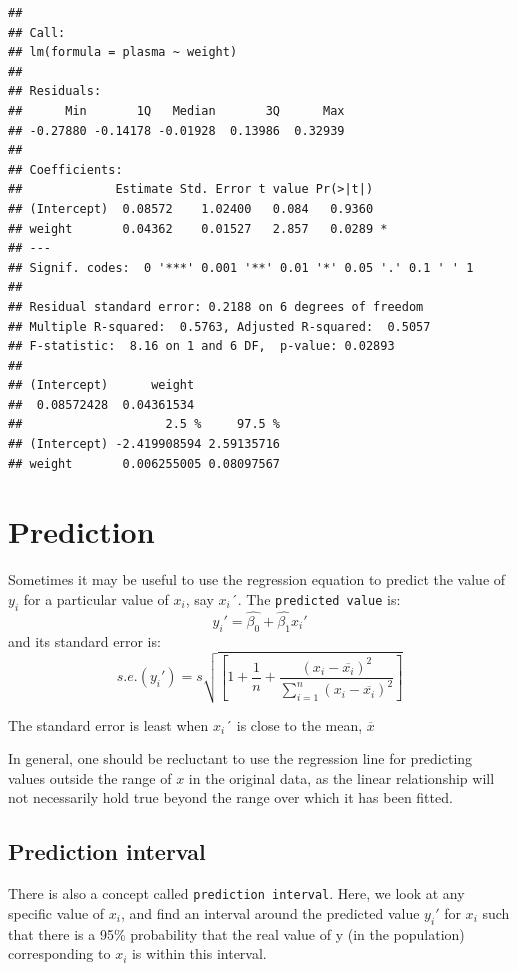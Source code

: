 \documentclass[]{article}
\begin{document}
\begin{verbatim}
## 
## Call:
## lm(formula = plasma ~ weight)
## 
## Residuals:
##      Min       1Q   Median       3Q      Max 
## -0.27880 -0.14178 -0.01928  0.13986  0.32939 
## 
## Coefficients:
##             Estimate Std. Error t value Pr(>|t|)  
## (Intercept)  0.08572    1.02400   0.084   0.9360  
## weight       0.04362    0.01527   2.857   0.0289 *
## ---
## Signif. codes:  0 '***' 0.001 '**' 0.01 '*' 0.05 '.' 0.1 ' ' 1
## 
## Residual standard error: 0.2188 on 6 degrees of freedom
## Multiple R-squared:  0.5763, Adjusted R-squared:  0.5057 
## F-statistic:  8.16 on 1 and 6 DF,  p-value: 0.02893
## 
## (Intercept)      weight 
##  0.08572428  0.04361534 
##                    2.5 %     97.5 %
## (Intercept) -2.419908594 2.59135716
## weight       0.006255005 0.08097567
\end{verbatim}

\hypertarget{prediction}{%
\section{Prediction}\label{prediction}}

Sometimes it may be useful to use the regression equation to predict the
value of \(y_i\) for a particular value of \(x_i\), say \(x_i´\). The
\texttt{predicted\ value} is: \[y_i'=\hat{\beta_0}+\hat{\beta_1}x_i'\]
and its standard error is:
\[s.e.(y_i')=s\sqrt{[1+\frac{1}{n}+\frac{(x_i-\overline{x_i})^2}{\sum_{i=1}^{n}(x_i-\overline{x_i})^2}]}\]

The standard error is least when \(x_i´\) is close to the mean,
\(\overline{x}\)

In general, one should be recluctant to use the regression line for
predicting values outside the range of \(x\) in the original data, as
the linear relationship will not necessarily hold true beyond the range
over which it has been fitted.

\hypertarget{prediction-interval}{%
\subsection{Prediction interval}\label{prediction-interval}}

There is also a concept called \texttt{prediction\ interval}. Here, we
look at any specific value of \(x_i\), and find an interval around the
predicted value \(y_i'\) for \(x_i\) such that there is a 95\%
probability that the real value of y (in the population) corresponding
to \(x_i\) is within this interval.
\end{document}
